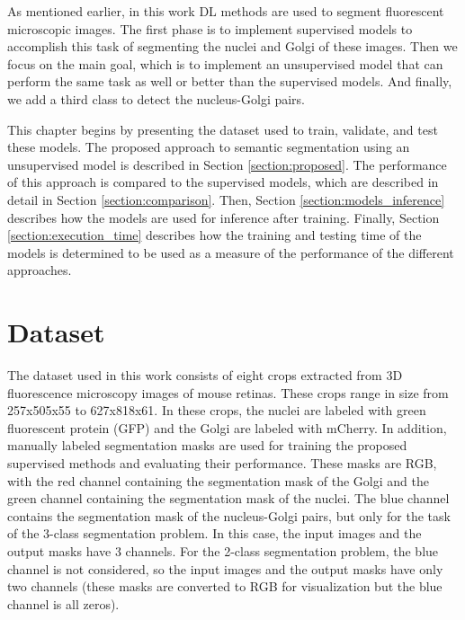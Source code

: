 \label{chapter:methodology}

As mentioned earlier, in this work \ac{DL} methods are used to segment fluorescent microscopic images. The first phase is to implement supervised models to accomplish this task of segmenting the nuclei and Golgi of these images. Then we focus on the main goal, which is to implement an unsupervised model that can perform the same task as well or better than the supervised models. And finally, we add a third class to detect the nucleus-Golgi pairs.

This chapter begins by presenting the dataset used to train, validate, and test these models. The proposed approach to semantic segmentation using an unsupervised model is described in Section \ref{section:proposed}. The performance of this approach is compared to the supervised models, which are described in detail in Section \ref{section:comparison}. Then, Section \ref{section:models_inference} describes how the models are used for inference after training. Finally, Section \ref{section:execution_time} describes how the training and testing time of the models is determined to be used as a measure of the performance of the different approaches.

\section{Dataset}
\label{section:dataset}

The dataset used in this work consists of eight crops extracted from \ac{3D} fluorescence microscopy images of mouse retinas. These crops range in size from 257x505x55 to 627x818x61. In these crops, the nuclei are labeled with green fluorescent protein (GFP) and the Golgi are labeled with mCherry. In addition, manually labeled segmentation masks are used for training the proposed supervised methods and evaluating their performance. These masks are RGB, with the red channel containing the segmentation mask of the Golgi and the green channel containing the segmentation mask of the nuclei. The blue channel contains the segmentation mask of the nucleus-Golgi pairs, but only for the task of the 3-class segmentation problem. In this case, the input images and the output masks have 3 channels. For the 2-class segmentation problem, the blue channel is not considered, so the input images and the output masks have only two channels (these masks are converted to RGB for visualization but the blue channel is all zeros).

